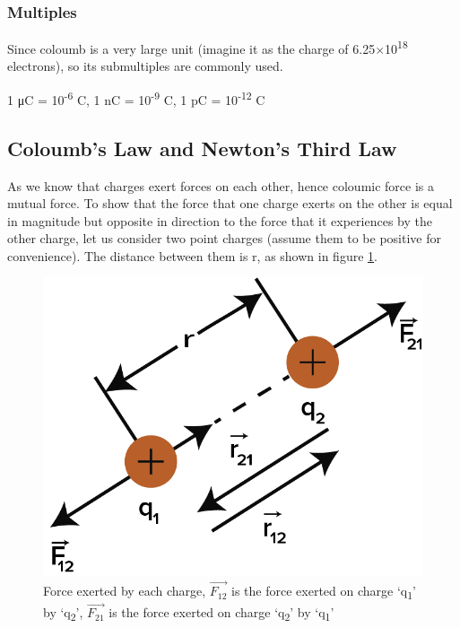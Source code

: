 \subsubsection{Multiples}
Since coloumb is a very large unit (imagine it as the charge of 6.25$\times$10\textsuperscript{18} electrons),
so its submultiples are commonly used.

1 μC = 10\textsuperscript{-6} C, 1 nC = 10\textsuperscript{-9} C, 1 pC = 10\textsuperscript{-12} C
\subsection{Coloumb's Law and Newton's Third Law}
As we know that charges exert forces on each other,
hence coloumic force is a mutual force.
To show that the force that one charge exerts on the other is
equal in magnitude but opposite in direction to the force that
it experiences by the other charge,
let us consider two point charges (assume them to be positive for convenience).
The distance between them is r, as shown in figure \ref{fig:11.1}.
\begin{figure}[H]
  \centering
  \includegraphics[scale = 0.8]{Images/11.1.png}
  \caption{Force exerted by each charge, $\vec{F_{12}}$ is the force
  exerted  on charge `q\textsubscript{1}' by `q\textsubscript{2}', $\vec{F_{21}}$ is the force exerted on charge `q\textsubscript{2}' by `q\textsubscript{1}'}
  \label{fig:11.1}
\end{figure}

